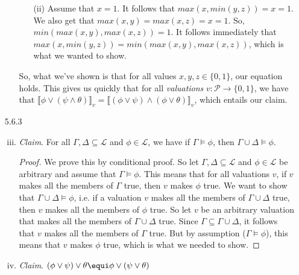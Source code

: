 \begin{enumerate}
\begin{enumerate}[(i)]
\begin{itemize}
              \item[(ii)]  Assume that $x=1$.
                It follows that
                $max(x, min(y,z)) = x=1$.
                We also get that
                $max(x,y) = max(x,z) = x=1$.
                So,
                $min(max(x,y), max(x,z)) = 1$.
                It follows immediately that
                $max(x, min(y,z)) = min(max(x,y), max(x,z))$,
                which is what we wanted to show.
            \end{itemize}
            So, what we've shown is that for all values $x,y,z\in\{0,1\}$, our equation holds.
            This gives us quickly that for all \emph{valuations}
            $v:\mathcal{P}\to\{0,1\}$,
            we have that
            $\llbracket \phi \vee (\psi \wedge \theta) \rrbracket_v = \llbracket(\phi \vee \psi) \wedge (\phi \vee \theta)\rrbracket_v$,
            which entails our claim.

        \end{enumerate}

		\item[5.6.3] 

		\begin{enumerate}[(i)]
		
			\setcounter{enumii}{2}
			
			\item \emph{Claim}. For all $\Gamma,\Delta\subseteq\mathcal{L}$ and $\phi\in\mathcal{L}$, we have if $\Gamma\vDash\phi$, then $\Gamma\cup\Delta\vDash\phi$.
			
			\begin{proof}
			We prove this by conditional proof. So let $\Gamma,\Delta\subseteq\mathcal{L}$ and $\phi\in\mathcal{L}$ be arbitrary and assume that $\Gamma\vDash\phi$. This means that for all valuations $v$, if $v$ makes all the members of $\Gamma$ true, then $v$ makes $\phi$ true. We want to show that $\Gamma\cup\Delta\vDash\phi$, i.e. if a valuation $v$ makes all the members of  $\Gamma\cup\Delta$ true, then $v$ makes all the members of $\phi$ true. So let $v$ be an arbitrary valuation that makes all the members of  $\Gamma\cup\Delta$ true. Since $\Gamma\subseteq\Gamma\cup\Delta$, it follows that $v$ makes all the members of $\Gamma$ true. But by assumption ($\Gamma\vDash\phi$), this means that $v$ makes $\phi$ true, which is what we needed to show.
			\end{proof}
		
			\setcounter{enumii}{12}
			
			\item \emph{Claim}. $(\phi\lor\psi)\lor\theta\equi \phi\lor(\psi\lor\theta)$
			

\end{enumerate}
\end{enumerate}
